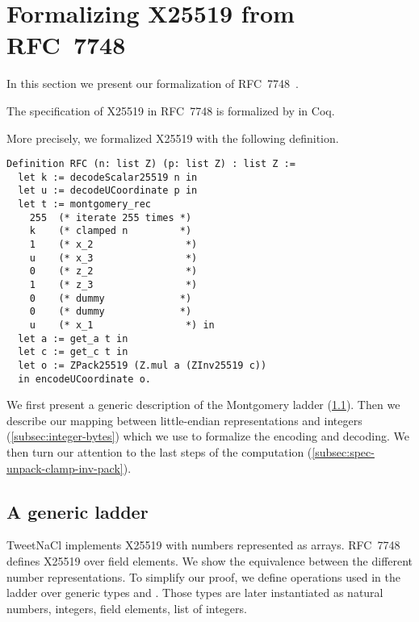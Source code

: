 \section{Formalizing X25519 from RFC~7748}
\label{sec:Coq-RFC}

In this section we present our formalization of RFC~7748~\cite{rfc7748}.

\begin{informaltheorem}
The specification of X25519 in RFC~7748 is formalized by  in Coq.
\end{informaltheorem}

More precisely, we formalized X25519 with the following definition.
\begin{lstlisting}[language=Coq]
Definition RFC (n: list Z) (p: list Z) : list Z :=
  let k := decodeScalar25519 n in
  let u := decodeUCoordinate p in
  let t := montgomery_rec
    255  (* iterate 255 times *)
    k    (* clamped n         *)
    1    (* x_2                *)
    u    (* x_3                *)
    0    (* z_2                *)
    1    (* z_3                *)
    0    (* dummy             *)
    0    (* dummy             *)
    u    (* x_1                *) in
  let a := get_a t in
  let c := get_c t in
  let o := ZPack25519 (Z.mul a (ZInv25519 c))
  in encodeUCoordinate o.
\end{lstlisting}

We first present a generic description of the Montgomery ladder (\ref{subsec:spec-ladder}).
Then we describe our mapping between little-endian representations and integers
(\ref{subsec:integer-bytes}) which we use to formalize the encoding and decoding.
We then turn our attention to the last steps of the computation
(\ref{subsec:spec-unpack-clamp-inv-pack}).




\subsection{A generic ladder}
\label{subsec:spec-ladder}


TweetNaCl implements X25519 with numbers represented as arrays.
RFC~7748 defines X25519 over field elements. We show the equivalence between
the different number representations. To simplify our proof, we define operations
used in the ladder over generic types  and .
Those types are later instantiated as natural numbers, integers, field elements,
list of integers.

